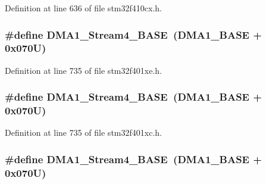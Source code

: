 Definition at line 636 of file stm32f410cx.\+h.

\subsubsection[{\texorpdfstring{D\+M\+A1\+\_\+\+Stream4\+\_\+\+B\+A\+SE}{DMA1_Stream4_BASE}}]{\setlength{\rightskip}{0pt plus 5cm}\#define D\+M\+A1\+\_\+\+Stream4\+\_\+\+B\+A\+SE~({\bf D\+M\+A1\+\_\+\+B\+A\+SE} + 0x070\+U)}\hypertarget{group___peripheral__registers__structures_ga757a3c0d866c0fe68c6176156065a26b}{}\label{group___peripheral__registers__structures_ga757a3c0d866c0fe68c6176156065a26b}


Definition at line 735 of file stm32f401xe.\+h.

\subsubsection[{\texorpdfstring{D\+M\+A1\+\_\+\+Stream4\+\_\+\+B\+A\+SE}{DMA1_Stream4_BASE}}]{\setlength{\rightskip}{0pt plus 5cm}\#define D\+M\+A1\+\_\+\+Stream4\+\_\+\+B\+A\+SE~({\bf D\+M\+A1\+\_\+\+B\+A\+SE} + 0x070\+U)}\hypertarget{group___peripheral__registers__structures_ga757a3c0d866c0fe68c6176156065a26b}{}\label{group___peripheral__registers__structures_ga757a3c0d866c0fe68c6176156065a26b}


Definition at line 735 of file stm32f401xc.\+h.

\subsubsection[{\texorpdfstring{D\+M\+A1\+\_\+\+Stream4\+\_\+\+B\+A\+SE}{DMA1_Stream4_BASE}}]{\setlength{\rightskip}{0pt plus 5cm}\#define D\+M\+A1\+\_\+\+Stream4\+\_\+\+B\+A\+SE~({\bf D\+M\+A1\+\_\+\+B\+A\+SE} + 0x070\+U)}\hypertarget{group___peripheral__registers__structures_ga757a3c0d866c0fe68c6176156065a26b}{}\label{group___peripheral__registers__structures_ga757a3c0d866c0fe68c6176156065a26b}


